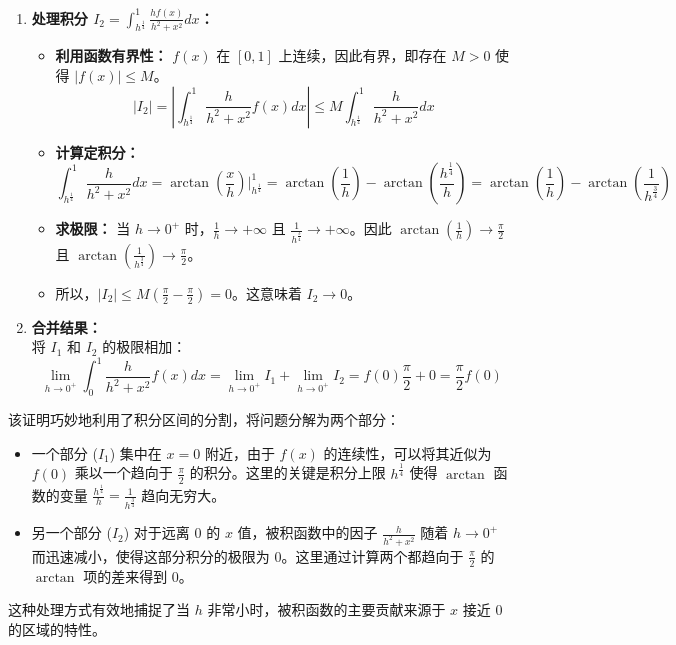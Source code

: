 \documentclass[lang=cn,newtx,10pt,scheme=chinese]{elegantbook}
\begin{document}
\begin{note}
\begin{enumerate}
    \item \textbf{处理积分 $I_2 = \int_{h^{\frac{1}{4}}}^{1} \frac{hf(x)}{h^2+x^2}dx$：}
    \begin{itemize}
        \item \textbf{利用函数有界性：} $f(x)$ 在 $[0,1]$ 上连续，因此有界，即存在 $M > 0$ 使得 $|f(x)| \le M$。
        $$|I_2| = \left| \int_{h^{\frac{1}{4}}}^{1} \frac{h}{h^2+x^2}f(x)dx \right| \le M \int_{h^{\frac{1}{4}}}^{1} \frac{h}{h^2+x^2}dx$$
        \item \textbf{计算定积分：}
        $$\int_{h^{\frac{1}{4}}}^{1} \frac{h}{h^2+x^2}dx = \arctan\left(\frac{x}{h}\right) \Big|_{h^{\frac{1}{4}}}^{1} = \arctan\left(\frac{1}{h}\right) - \arctan\left(\frac{h^{\frac{1}{4}}}{h}\right) = \arctan\left(\frac{1}{h}\right) - \arctan\left(\frac{1}{h^{\frac{3}{4}}}\right)$$
        \item \textbf{求极限：} 当 $h \to 0^+$ 时，$\frac{1}{h} \to +\infty$ 且 $\frac{1}{h^{\frac{3}{4}}} \to +\infty$。因此 $\arctan\left(\frac{1}{h}\right) \to \frac{\pi}{2}$ 且 $\arctan\left(\frac{1}{h^{\frac{3}{4}}}\right) \to \frac{\pi}{2}$。
        \item 所以，$|I_2| \le M \left( \frac{\pi}{2} - \frac{\pi}{2} \right) = 0$。这意味着 $I_2 \to 0$。
    \end{itemize}

    \item \textbf{合并结果：} \\
    将 $I_1$ 和 $I_2$ 的极限相加：
    $$\lim_{h \to 0^+} \int_{0}^{1} \frac{h}{h^2 + x^2} f(x) dx = \lim_{h \to 0^+} I_1 + \lim_{h \to 0^+} I_2 = f(0)\frac{\pi}{2} + 0 = \frac{\pi}{2}f(0)$$
\end{enumerate}

该证明巧妙地利用了积分区间的分割，将问题分解为两个部分：
\begin{itemize}
    \item 一个部分 ($I_1$) 集中在 $x=0$ 附近，由于 $f(x)$ 的连续性，可以将其近似为 $f(0)$ 乘以一个趋向于 $\frac{\pi}{2}$ 的积分。这里的关键是积分上限 $h^{\frac{1}{4}}$ 使得 $\arctan$ 函数的变量 $\frac{h^{\frac{1}{4}}}{h} = \frac{1}{h^{\frac{3}{4}}}$ 趋向无穷大。
    \item 另一个部分 ($I_2$) 对于远离 $0$ 的 $x$ 值，被积函数中的因子 $\frac{h}{h^2+x^2}$ 随着 $h \to 0^+$ 而迅速减小，使得这部分积分的极限为 $0$。这里通过计算两个都趋向于 $\frac{\pi}{2}$ 的 $\arctan$ 项的差来得到 $0$。
\end{itemize}
这种处理方式有效地捕捉了当 $h$ 非常小时，被积函数的主要贡献来源于 $x$ 接近 $0$ 的区域的特性。
\end{note}
\end{document}
